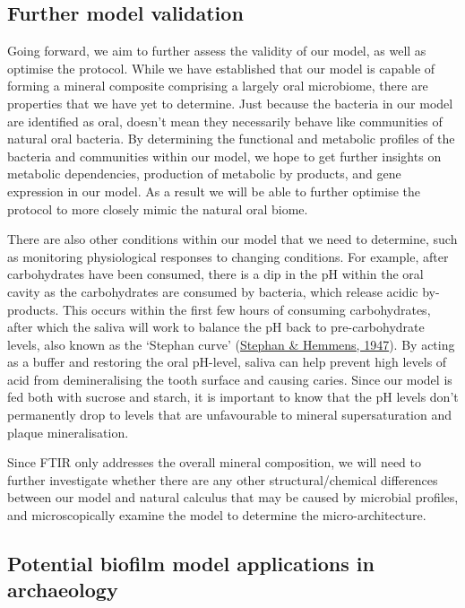 \documentclass[
  letterpaper,
]{book}
\begin{document}
\hypertarget{further-model-validation}{%
\subsection{Further model validation}\label{further-model-validation}}

Going forward, we aim to further assess the validity of our model, as
well as optimise the protocol. While we have established that our model
is capable of forming a mineral composite comprising a largely oral
microbiome, there are properties that we have yet to determine. Just
because the bacteria in our model are identified as oral, doesn't mean
they necessarily behave like communities of natural oral bacteria. By
determining the functional and metabolic profiles of the bacteria and
communities within our model, we hope to get further insights on
metabolic dependencies, production of metabolic by products, and gene
expression in our model. As a result we will be able to further optimise
the protocol to more closely mimic the natural oral biome.

There are also other conditions within our model that we need to
determine, such as monitoring physiological responses to changing
conditions. For example, after carbohydrates have been consumed, there
is a dip in the pH within the oral cavity as the carbohydrates are
consumed by bacteria, which release acidic by-products. This occurs
within the first few hours of consuming carbohydrates, after which the
saliva will work to balance the pH back to pre-carbohydrate levels, also
known as the `Stephan curve'
(\protect\hyperlink{ref-stephanStudiesChanges1947}{Stephan \& Hemmens,
1947}). By acting as a buffer and restoring the oral pH-level, saliva
can help prevent high levels of acid from demineralising the tooth
surface and causing caries. Since our model is fed both with sucrose and
starch, it is important to know that the pH levels don't permanently
drop to levels that are unfavourable to mineral supersaturation and
plaque mineralisation.

Since FTIR only addresses the overall mineral composition, we will need
to further investigate whether there are any other structural/chemical
differences between our model and natural calculus that may be caused by
microbial profiles, and microscopically examine the model to determine
the micro-architecture.

\hypertarget{bfmodels-in-arch}{%
\subsection{Potential biofilm model applications in
archaeology}\label{bfmodels-in-arch}}
\end{document}

